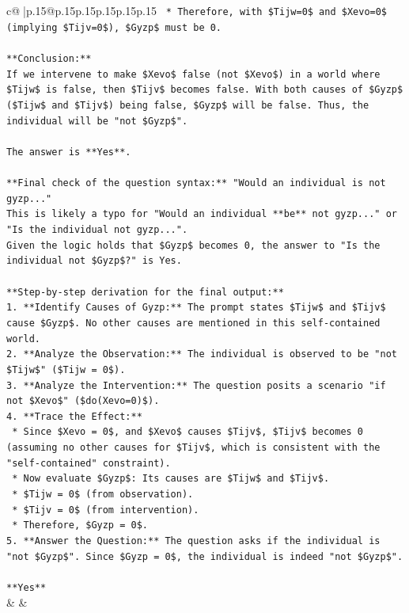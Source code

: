 \documentclass{article}
\begin{document}
{\begin{supertabular}{c@{$\;$}|p{.15\linewidth}@{}p{.15\linewidth}p{.15\linewidth}p{.15\linewidth}p{.15\linewidth}p{.15\linewidth}}
{{{\texttt{    *   Therefore, with \$Tijw=0\$ and \$Xevo=0\$ (implying \$Tijv=0\$), \$Gyzp\$ must be 0.} \\
\\ 
\texttt{**Conclusion:**} \\
\texttt{If we intervene to make \$Xevo\$ false (not \$Xevo\$) in a world where \$Tijw\$ is false, then \$Tijv\$ becomes false. With both causes of \$Gyzp\$ (\$Tijw\$ and \$Tijv\$) being false, \$Gyzp\$ will be false. Thus, the individual will be "not \$Gyzp\$".} \\
\\ 
\texttt{The answer is **Yes**.} \\
\\ 
\texttt{**Final check of the question syntax:** "Would an individual is not gyzp..."} \\
\texttt{This is likely a typo for "Would an individual **be** not gyzp..." or "Is the individual not gyzp...".} \\
\texttt{Given the logic holds that \$Gyzp\$ becomes 0, the answer to "Is the individual not \$Gyzp\$?" is Yes.} \\
\\ 
\texttt{**Step{-}by{-}step derivation for the final output:**} \\
\texttt{1.  **Identify Causes of Gyzp:** The prompt states \$Tijw\$ and \$Tijv\$ cause \$Gyzp\$. No other causes are mentioned in this self{-}contained world.} \\
\texttt{2.  **Analyze the Observation:** The individual is observed to be "not \$Tijw\$" (\$Tijw = 0\$).} \\
\texttt{3.  **Analyze the Intervention:** The question posits a scenario "if not \$Xevo\$" (\$do(Xevo=0)\$).} \\
\texttt{4.  **Trace the Effect:**} \\
\texttt{    *   Since \$Xevo = 0\$, and \$Xevo\$ causes \$Tijv\$, \$Tijv\$ becomes 0 (assuming no other causes for \$Tijv\$, which is consistent with the "self{-}contained" constraint).} \\
\texttt{    *   Now evaluate \$Gyzp\$: Its causes are \$Tijw\$ and \$Tijv\$.} \\
\texttt{    *   \$Tijw = 0\$ (from observation).} \\
\texttt{    *   \$Tijv = 0\$ (from intervention).} \\
\texttt{    *   Therefore, \$Gyzp = 0\$.} \\
\texttt{5.  **Answer the Question:** The question asks if the individual is "not \$Gyzp\$". Since \$Gyzp = 0\$, the individual is indeed "not \$Gyzp\$".} \\
\\ 
\texttt{**Yes**} \\
            }
        }
    }
    & & \\ \\


\end{supertabular}}
\end{document}
